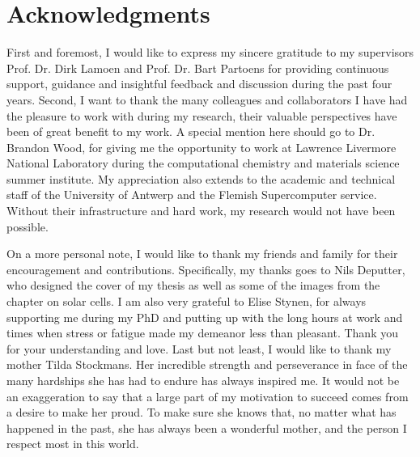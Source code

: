 \chapter*{Acknowledgments} \label{chapter:acknowledgements}

First and foremost, I would like to express my sincere gratitude to my supervisors Prof. Dr. Dirk Lamoen and Prof. Dr. Bart Partoens for providing continuous support, guidance and insightful feedback and discussion during the past four years. Second, I want to thank the many colleagues and collaborators I have had the pleasure to work with during my research, their valuable perspectives have been of great benefit to my work. A special mention here should go to Dr. Brandon Wood, for giving me the opportunity to work at Lawrence Livermore National Laboratory during the computational chemistry and materials science summer institute. My appreciation also extends to the academic and technical staff of the University of Antwerp and the Flemish Supercomputer service. Without their infrastructure and hard work, my research would not have been possible.

On a more personal note, I would like to thank my friends and family for their encouragement and contributions. Specifically, my thanks goes to Nils Deputter, who designed the cover of my thesis as well as some of the images from the chapter on solar cells. I am also very grateful to Elise Stynen, for always supporting me during my PhD and putting up with the long hours at work and times when stress or fatigue made my demeanor less than pleasant. Thank you for your understanding and love. Last but not least, I would like to thank my mother Tilda Stockmans. Her incredible strength and perseverance in face of the many hardships she has had to endure has always inspired me. It would not be an exaggeration to say that a large part of my motivation to succeed comes from a desire to make her proud. To make sure she knows that, no matter what has happened in the past, she has always been a wonderful mother, and the person I respect most in this world.
